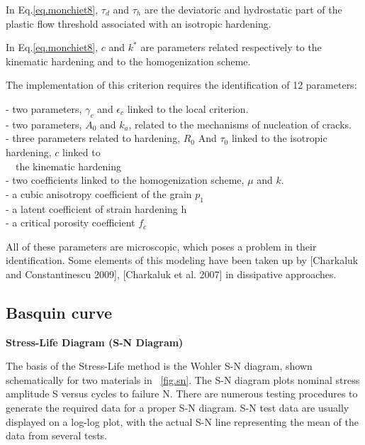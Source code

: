\documentclass[3p,times,procedia,number]{elsarticle}
\newcommand{\figref}[1]{\figurename~\ref{#1}}
\begin{document}
In Eq.\eqref{eq.monchiet8}, $\tau_d$ and $\tau_h$ are the deviatoric and hydrostatic part of the plastic flow threshold associated with an isotropic hardening.

In Eq.\eqref{eq.monchiet8}, $c$ and $k^{\ast}$ are parameters related respectively to the kinematic hardening and to the homogenization scheme.

The implementation of this criterion requires the identification of 12 parameters:
\begin{flushleft}
\qquad - \qquad two parameters, $\gamma_c$ and $\epsilon_c$ linked to the local criterion.\\
\qquad - \qquad two parameters, $A_0$ and $k_a$, related to the mechanisms of nucleation of cracks.\\
\qquad - \qquad three parameters related to hardening, $R_0$ And $\tau_0$ linked to the isotropic hardening, $c$ linked to\\
\qquad  \ \   \qquad   the kinematic hardening\\
\qquad - \qquad two coefficients linked to the homogenization scheme, $\mu$ and $k$.\\
\qquad - \qquad a cubic anisotropy coefficient of the grain $p_1$\\
\qquad - \qquad a latent coefficient of strain hardening h\\
\qquad - \qquad a critical porosity coefficient $f_c$\\
\end{flushleft}

All of these parameters are microscopic, which poses a problem in their identification. Some elements of this modeling have been taken up by [Charkaluk and Constantinescu 2009]\cite{charkaluk2009revisiting}, [Charkaluk et al. 2007]\cite{charkaluk2007approche} in dissipative approaches.





\subsection{Basquin curve}

\vspace{6pt}
\textbf{Stress-Life Diagram (S-N Diagram)}

The basis of the Stress-Life method is the Wohler S-N diagram, shown schematically for two
materials in \figref{fig.sn}. The S-N diagram plots nominal stress amplitude S versus cycles to
failure N. There are numerous testing procedures to generate the required data for a proper
S-N diagram. S-N test data are usually displayed on a log-log plot, with the actual S-N line
representing the mean of the data from several tests.
\end{document}
